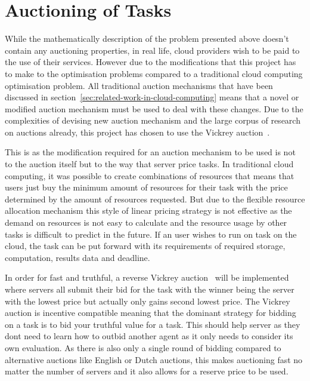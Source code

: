 
\section{Auctioning of Tasks}\label{sec:auctioning-of-tasks}
While the mathematically description of the problem presented above doesn't contain any auctioning properties, in real
life, cloud providers wish to be paid to the use of their services. However due to the modifications that
this project has to make to the optimisation problems compared to a traditional cloud computing optimisation problem.
All traditional auction mechanisms that have been discussed in section~\ref{sec:related-work-in-cloud-computing} means
that a novel or modified auction mechanism must be used to deal with these changes. Due to the complexities of devising
new auction mechanism and the large corpus of research on auctions already, this project has chosen to use the Vickrey
auction~\citep{vickrey}.

This is as the modification required for an auction mechanism to be used is not to the auction itself but to the way
that server price tasks. In traditional cloud computing, it was possible to create combinations of resources that means
that users just buy the minimum amount of resources for their task with the price determined by the amount of
resources requested. But due to the flexible resource allocation mechanism this style of linear pricing strategy is not
effective as the demand on resources is not easy to calculate and the resource usage by other tasks is difficult to
predict in the future. If an user wishes to run on task on the cloud, the task can be put forward with its
requirements of required storage, computation, results data and deadline.

In order for fast and truthful, a reverse Vickrey auction~\citep{vickrey}
will be implemented  where servers all submit their bid for the task with the winner being the server with the lowest
price but actually only gains second lowest price. The Vickrey auction is incentive compatible meaning that the dominant
strategy for bidding on a task is to bid your truthful value for a task. This should help server as they dont need
to learn how to outbid another agent as it only needs to consider its own evaluation.
As there is also only a single round of bidding compared to alternative auctions like English or Dutch
auctions, this makes auctioning fast no matter the number of servers and it also allows for a reserve price to be used.

